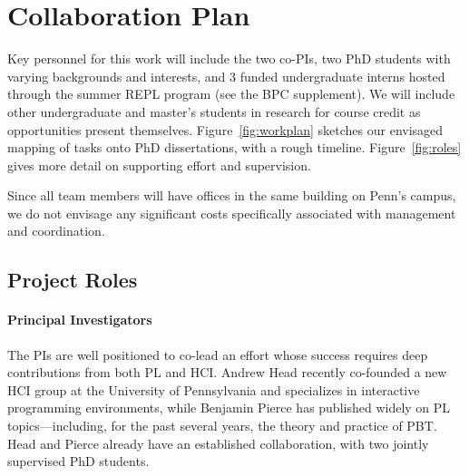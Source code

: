 \section*{Collaboration Plan }\label{appendix:coord}



Key personnel for this work will include the two co-PIs, two PhD
students with varying backgrounds and interests,
and 3 funded undergraduate interns hosted through the summer REPL
program (see the BPC supplement). We will include other undergraduate and
master's students in research for course credit as opportunities
present themselves.
Figure~\ref{fig:workplan} sketches our envisaged mapping of tasks onto
PhD dissertations, with a rough timeline.  Figure~\ref{fig:roles}
gives more detail on supporting effort and supervision.

Since all team members will have offices in the same building on
Penn's campus, we do not envisage any significant costs specifically
associated with management and coordination.

\subsection*{Project Roles}

\paragraph*{Principal Investigators}
%
The PIs are well positioned to co-lead an effort whose success
requires deep contributions from both PL and HCI.  Andrew Head
recently co-founded a new HCI group at the University of Pennsylvania
and specializes in interactive programming environments, while
Benjamin Pierce has published widely on PL topics---including, for the
past several years, the theory and practice of PBT.  Head and Pierce
already have an established collaboration, with two jointly supervised
PhD students.

